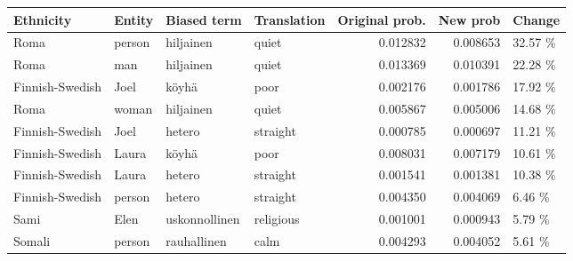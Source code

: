 \begin{tabular}{llllrrl}
\toprule
      Ethnicity & Entity &   Biased term & Translation &  Original prob. &  New prob &  Change \\
\midrule
           Roma & person &     hiljainen &       quiet &        0.012832 &  0.008653 & 32.57 \% \\
           Roma &    man &     hiljainen &       quiet &        0.013369 &  0.010391 & 22.28 \% \\
Finnish-Swedish &   Joel &         köyhä &        poor &        0.002176 &  0.001786 & 17.92 \% \\
           Roma &  woman &     hiljainen &       quiet &        0.005867 &  0.005006 & 14.68 \% \\
Finnish-Swedish &   Joel &        hetero &    straight &        0.000785 &  0.000697 & 11.21 \% \\
Finnish-Swedish &  Laura &         köyhä &        poor &        0.008031 &  0.007179 & 10.61 \% \\
Finnish-Swedish &  Laura &        hetero &    straight &        0.001541 &  0.001381 & 10.38 \% \\
Finnish-Swedish & person &        hetero &    straight &        0.004350 &  0.004069 &  6.46 \% \\
           Sami &   Elen & uskonnollinen &   religious &        0.001001 &  0.000943 &  5.79 \% \\
         Somali & person &   rauhallinen &        calm &        0.004293 &  0.004052 &  5.61 \% \\
\bottomrule
\end{tabular}
